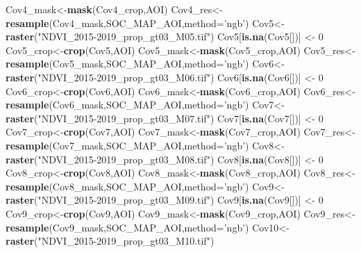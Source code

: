 \documentclass[
  10pt,
  b5paper,
]{book}
\newenvironment{Shaded}{\begin{snugshade}}{\end{snugshade}}
\newcommand{\DataTypeTok}[1]{\textcolor[rgb]{0.13,0.29,0.53}{#1}}
\newcommand{\DecValTok}[1]{\textcolor[rgb]{0.00,0.00,0.81}{#1}}
\newcommand{\KeywordTok}[1]{\textcolor[rgb]{0.13,0.29,0.53}{\textbf{#1}}}
\newcommand{\NormalTok}[1]{#1}
\newcommand{\StringTok}[1]{\textcolor[rgb]{0.31,0.60,0.02}{#1}}
\begin{document}
\begin{Shaded}
\begin{Highlighting}[]
\NormalTok{Cov4_mask<-}\KeywordTok{mask}\NormalTok{(Cov4_crop,AOI)}
\NormalTok{Cov4_res<-}\KeywordTok{resample}\NormalTok{(Cov4_mask,SOC_MAP_AOI,}\DataTypeTok{method=}\StringTok{'ngb'}\NormalTok{) }
\NormalTok{Cov5<-}\KeywordTok{raster}\NormalTok{(}\StringTok{"NDVI_2015-2019_prop_gt03_M05.tif"}\NormalTok{)}
\NormalTok{Cov5[}\KeywordTok{is.na}\NormalTok{(Cov5[])] <-}\StringTok{ }\DecValTok{0}
\NormalTok{Cov5_crop<-}\KeywordTok{crop}\NormalTok{(Cov5,AOI)}
\NormalTok{Cov5_mask<-}\KeywordTok{mask}\NormalTok{(Cov5_crop,AOI)}
\NormalTok{Cov5_res<-}\KeywordTok{resample}\NormalTok{(Cov5_mask,SOC_MAP_AOI,}\DataTypeTok{method=}\StringTok{'ngb'}\NormalTok{) }
\NormalTok{Cov6<-}\KeywordTok{raster}\NormalTok{(}\StringTok{"NDVI_2015-2019_prop_gt03_M06.tif"}\NormalTok{)}
\NormalTok{Cov6[}\KeywordTok{is.na}\NormalTok{(Cov6[])] <-}\StringTok{ }\DecValTok{0}
\NormalTok{Cov6_crop<-}\KeywordTok{crop}\NormalTok{(Cov6,AOI)}
\NormalTok{Cov6_mask<-}\KeywordTok{mask}\NormalTok{(Cov6_crop,AOI)}
\NormalTok{Cov6_res<-}\KeywordTok{resample}\NormalTok{(Cov6_mask,SOC_MAP_AOI,}\DataTypeTok{method=}\StringTok{'ngb'}\NormalTok{) }
\NormalTok{Cov7<-}\KeywordTok{raster}\NormalTok{(}\StringTok{"NDVI_2015-2019_prop_gt03_M07.tif"}\NormalTok{)}
\NormalTok{Cov7[}\KeywordTok{is.na}\NormalTok{(Cov7[])] <-}\StringTok{ }\DecValTok{0}
\NormalTok{Cov7_crop<-}\KeywordTok{crop}\NormalTok{(Cov7,AOI)}
\NormalTok{Cov7_mask<-}\KeywordTok{mask}\NormalTok{(Cov7_crop,AOI)}
\NormalTok{Cov7_res<-}\KeywordTok{resample}\NormalTok{(Cov7_mask,SOC_MAP_AOI,}\DataTypeTok{method=}\StringTok{'ngb'}\NormalTok{) }
\NormalTok{Cov8<-}\KeywordTok{raster}\NormalTok{(}\StringTok{"NDVI_2015-2019_prop_gt03_M08.tif"}\NormalTok{)}
\NormalTok{Cov8[}\KeywordTok{is.na}\NormalTok{(Cov8[])] <-}\StringTok{ }\DecValTok{0}
\NormalTok{Cov8_crop<-}\KeywordTok{crop}\NormalTok{(Cov8,AOI)}
\NormalTok{Cov8_mask<-}\KeywordTok{mask}\NormalTok{(Cov8_crop,AOI)}
\NormalTok{Cov8_res<-}\KeywordTok{resample}\NormalTok{(Cov8_mask,SOC_MAP_AOI,}\DataTypeTok{method=}\StringTok{'ngb'}\NormalTok{) }
\NormalTok{Cov9<-}\KeywordTok{raster}\NormalTok{(}\StringTok{"NDVI_2015-2019_prop_gt03_M09.tif"}\NormalTok{)}
\NormalTok{Cov9[}\KeywordTok{is.na}\NormalTok{(Cov9[])] <-}\StringTok{ }\DecValTok{0}
\NormalTok{Cov9_crop<-}\KeywordTok{crop}\NormalTok{(Cov9,AOI)}
\NormalTok{Cov9_mask<-}\KeywordTok{mask}\NormalTok{(Cov9_crop,AOI)}
\NormalTok{Cov9_res<-}\KeywordTok{resample}\NormalTok{(Cov9_mask,SOC_MAP_AOI,}\DataTypeTok{method=}\StringTok{'ngb'}\NormalTok{) }
\NormalTok{Cov10<-}\KeywordTok{raster}\NormalTok{(}\StringTok{"NDVI_2015-2019_prop_gt03_M10.tif"}\NormalTok{)}

\end{Highlighting}
\end{Shaded}
\end{document}

